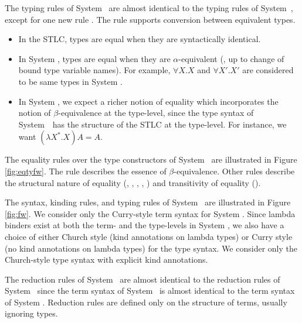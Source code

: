 The typing rules of System \Fw\ are almost identical to the typing rules of
System~\F, except for one new rule . The  rule
supports conversion between equivalent types.

\begin{itemize}
\item In the STLC, types are equal when they are syntactically identical.
\item In System \F, types are equal when they are $\alpha$-equivalent
(\ie, up to change of bound type variable names). For example,
$\forall X.X$ and $\forall X'.X'$ are considered to be same types in System \F.

\item
In System \Fw, we expect a richer notion of equality which incorporates
the notion of $\beta$-equivalence at the type-level, since the type syntax of
System~\Fw\ has the structure of the STLC at the type-level.
For instance, we want $(\lambda X^{*}.X) A = A$. 
\end{itemize}

The equality rules over the type constructors of System \Fw\ are
illustrated in Figure \ref{fig:eqtyfw}. The  rule
describes the essence of $\beta$-equivalence.
Other rules describe the structural nature of equality (,
, , , )
and transitivity of equality ().


The syntax, kinding rules, and typing rules of System \Fw\ are
illustrated in Figure \ref{fig:fw}. We consider only the Curry-style
term syntax for System \Fw. Since lambda binders exist at both
the term- and the type-levels in System \Fw, we also have a choice of
either Church style (kind annotations on lambda types)
or Curry style (no kind annotations on lambda types) for the type syntax.
We consider only the Church-style type syntax with explicit kind annotations.

The reduction rules of System \Fw\ are almost identical
to the reduction rules of System \F\ since the term syntax of System \Fw\ is
almost identical to the term syntax of System \F. Reduction rules are defined
only on the structure of terms, usually ignoring types.


